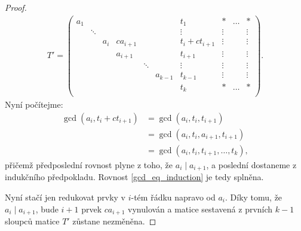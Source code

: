 \begin{proof}
\begin{align*}
T' =
    \left(
    \begin{array}{ccccccc|ccc}
        a_1 &        &     &          &        &         & t_1              & \ast   & \hdots & \ast   \\
            & \ddots &     &          &        &         & \vdots           & \vdots &        & \vdots \\
            &        & a_i & ca_{i+1} &        &         & t_{i} + ct_{i+1} & \vdots &        & \vdots \\
            &        &     & a_{i+1}  &        &         & t_{i+1}          & \vdots &        & \vdots \\
            &        &     &          & \ddots &         & \vdots           & \vdots &        & \vdots \\
            &        &     &          &        & a_{k-1} & t_{k-1}          & \vdots &        & \vdots \\
            &        &     &          &        &         & t_k              & \ast   & \hdots & \ast   \\
    \end{array}
    \right)
.
\end{align*}
Nyní počítejme:
\begin{align*}
    \gcd(a_i, t_{i} + ct_{i+1}) &= \gcd(a_i, t_{i}, t_{i+1}) \\
                                &= \gcd(a_i, t_{i}, a_{i+1}, t_{i+1}) \\
                                &= \gcd(a_i, t_{i}, t_{i+1},\dots,t_{k}),
\end{align*}
přičemž předposlední rovnost plyne z toho, že $ a_i \mid a_{i+1} $, a
poslední dostaneme z indukčního předpokladu. Rovnost \ref{gcd_eq_induction} je
tedy splněna.

Nyní stačí jen redukovat prvky v $ i $-tém řádku napravo od $ a_i $. Díky tomu,
že $ a_i \mid a_{i+1} $, bude $ i + 1 $ prvek $ ca_{i+1} $ vynulován a
matice sestavená z prvních $ k - 1 $ sloupců matice $ T' $ zůstane nezměněna.
\end{proof}



